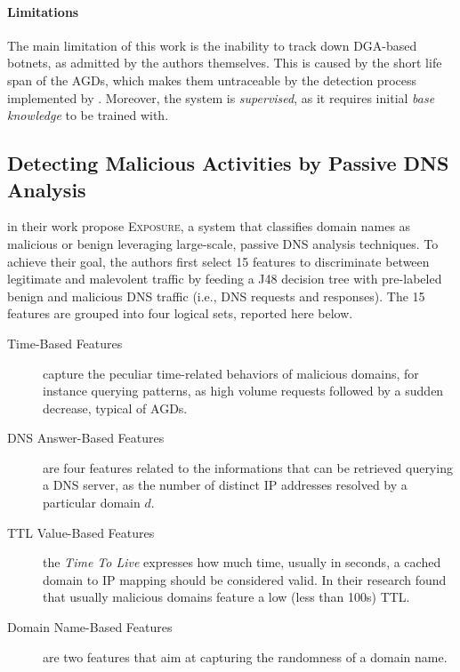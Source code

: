 \paragraph{Limitations} The main limitation of this work is the inability
to track down DGA-based botnets, as admitted by the authors themselves. This is caused by the short life span of the AGDs, which makes them untraceable by the
detection process implemented by \citet{antonakakis2011}. Moreover, the system is \emph{supervised}, as it requires initial
\emph{base knowledge} to be trained with.


\subsection{Detecting Malicious Activities by Passive DNS Analysis} %
\label{sub:exposure_finding_malicious_domains_using_passive_dns_analysis}
\citet{bilge2011exposure} in their work propose \textsc{Exposure}, a system that
classifies domain names as malicious or benign leveraging large-scale, passive
DNS analysis techniques. To achieve their goal, the authors first select 15 features
to discriminate between legitimate and malevolent traffic by feeding a J48 decision
tree with pre-labeled benign and malicious DNS traffic (i.e., DNS requests and
responses). The 15 features are grouped into four logical sets, reported here below.

\begin{description}
    \item[Time-Based Features] capture the peculiar time-related behaviors of
        malicious domains, for instance querying patterns, as high volume requests
        followed by a sudden decrease, typical of AGDs.
    \item[DNS Answer-Based Features] are four features related to the informations
        that can be retrieved querying a DNS server, as the number of distinct IP
        addresses resolved by a particular domain $d$.
    \item[TTL Value-Based Features] the \emph{Time To Live} expresses how much time,
        usually in seconds, a cached domain to IP mapping should be considered valid.
        In their research \citet{bilge2011exposure} found that usually malicious
        domains feature a low (less than 100s) TTL.
    \item[Domain Name-Based Features] are two features that aim at capturing the
        randomness of a domain name.
\end{description}

